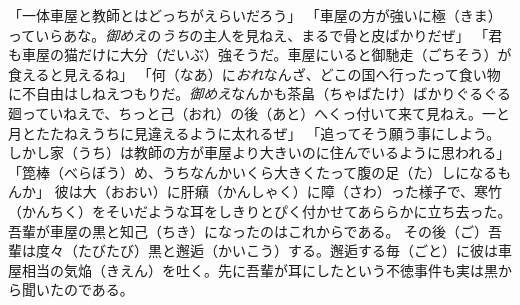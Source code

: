 \documentclass{book}
\begin{document}
「一体車屋と教師とはどっちがえらいだろう」
「車屋の方が強いに極（きま）っていらあな。\emph{御めえ}の\emph{うち}の主人を見ねえ、まるで骨と皮ばかりだぜ」
「君も車屋の猫だけに大分（だいぶ）強そうだ。車屋にいると御馳走（ごちそう）が食えると見えるね」
「何（なあ）に\emph{おれ}なんざ、どこの国へ行ったって食い物に不自由はしねえつもりだ。\emph{御めえ}なんかも茶畠（ちゃばたけ）ばかりぐるぐる廻っていねえで、ちっと己（おれ）の後（あと）へくっ付いて来て見ねえ。一と月とたたねえうちに見違えるように太れるぜ」
「追ってそう願う事にしよう。しかし家（うち）は教師の方が車屋より大きいのに住んでいるように思われる」
「箆棒（べらぼう）め、うちなんかいくら大きくたって腹の足（た）しになるもんか」
彼は大（おおい）に肝癪（かんしゃく）に障（さわ）った様子で、寒竹（かんちく）をそいだような耳をしきりとぴく付かせてあららかに立ち去った。吾輩が車屋の黒と知己（ちき）になったのはこれからである。
その後（ご）吾輩は度々（たびたび）黒と邂逅（かいこう）する。邂逅する毎（ごと）に彼は車屋相当の気焔（きえん）を吐く。先に吾輩が耳にしたという不徳事件も実は黒から聞いたのである。
\end{document}
